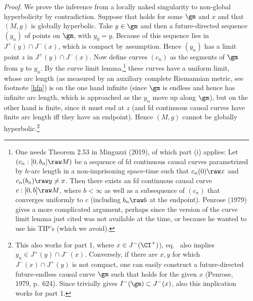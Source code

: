 \documentclass[12pt]{article}
\begin{document}
\noindent 
\emph{Proof.}  We  prove the inference from a locally naked singularity to non-global hyperbolicity by contradiction.  Suppose that  holds for some $\gm$ and $x$ and that $(M,g)$ is globally hyperbolic.
 Take $y\in \gm$ and then a future-directed sequence $(y_n)$ of points on $\gm$, with $y_0=y$. 
 Because of  this sequence lies in  $J^+(y)\cap J^-(x)$, which is compact by assumption. Hence 
 $(y_n)$ has a limit point $z$ in  $J^+(y)\cap J^-(x)$. Now define curves $(c_n)$ as the segments of $\gm$ from $y$ to $y_n$.
 By the curve limit lemma,\footnote{One needs Theorem 2.53 in Minguzzi (2019), of which part (i) applies:
 Let $(c_n: [0,b_n]\raw M)$ be a sequence of fd continuous causal curves parametrized by $h$-arc length in a non-imprisoning space-time such that $c_n(0)\raw x$ and $c_n(b_n)\raw y\neq x$. Then there exists an fd continuous causal curve $c:[0,b]\raw M$,
where $b<\infty$ as well as a subsequence of $(c_n)$ that converges uniformly to $c$ (including
$b_n\raw b$ at the endpoint).
  Penrose (1979) gives a more complicated argument, perhaps since the version of the  curve limit lemma just cited was not available at the time, or because he wanted to use his TIP's (which we avoid).} these curves have a uniform limit, whose arc length (as measured by an auxiliary complete Riemannian metric, see footnote \ref{hfn})
  is on the one hand infinite (since $\gm$ is endless and hence has infinite arc length, which is approached as the $y_n$ move up along $\gm$), but on the other hand is finite, since it must end at $z$ (and fd continuous causal curves have finite arc length iff they have an endpoint). 
   Hence $(M,g)$ cannot be globally hyperbolic.\footnote{This also works for part 1, where  $x\in J^-(\CI^+)$), eq.\   also implies $y_n\in  J^+(y)\cap J^-(x)$.
    Conversely, 
if there are $x,y$ for which $J^-(x)\cap J^+(y)$ is not compact, one can easily construct  a future-directed future-endless causal curve $\gm$ such that  holds for the given $x$ (Penrose, 1979, p.\ 624). Since   trivially gives $I^-(\gm)\subset J^-(x)$, also this implication works for  part 1.}
 \enp\smallskip
\end{document}
